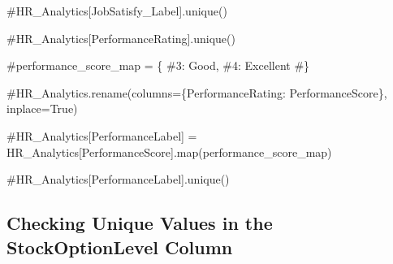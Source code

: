 \documentclass[
  letterpaper,
  DIV=11,
  numbers=noendperiod]{scrartcl}
\newenvironment{Shaded}{\begin{snugshade}}{\end{snugshade}}
\newcommand{\CommentTok}[1]{\textcolor[rgb]{0.37,0.37,0.37}{#1}}
\begin{document}
\begin{Shaded}
\begin{Highlighting}[]
\CommentTok{\#HR\_Analytics[\textquotesingle{}JobSatisfy\_Label\textquotesingle{}].unique()}
\end{Highlighting}
\end{Shaded}

\begin{Shaded}
\begin{Highlighting}[]
\CommentTok{\#HR\_Analytics[\textquotesingle{}PerformanceRating\textquotesingle{}].unique()}
\end{Highlighting}
\end{Shaded}

\begin{Shaded}
\begin{Highlighting}[]
\CommentTok{\#performance\_score\_map = \{}
    \CommentTok{\#3: \textquotesingle{}Good\textquotesingle{},}
    \CommentTok{\#4: \textquotesingle{}Excellent\textquotesingle{}}
\CommentTok{\#\}}
\end{Highlighting}
\end{Shaded}

\begin{Shaded}
\begin{Highlighting}[]
\CommentTok{\#HR\_Analytics.rename(columns=\{\textquotesingle{}PerformanceRating\textquotesingle{}: \textquotesingle{}PerformanceScore\textquotesingle{}\}, inplace=True)}
\end{Highlighting}
\end{Shaded}

\begin{Shaded}
\begin{Highlighting}[]
\CommentTok{\#HR\_Analytics[\textquotesingle{}PerformanceLabel\textquotesingle{}] = HR\_Analytics[\textquotesingle{}PerformanceScore\textquotesingle{}].map(performance\_score\_map)}
\end{Highlighting}
\end{Shaded}

\begin{Shaded}
\begin{Highlighting}[]
\CommentTok{\#HR\_Analytics[\textquotesingle{}PerformanceLabel\textquotesingle{}].unique()}
\end{Highlighting}
\end{Shaded}

\subsection{Checking Unique Values in the StockOptionLevel
Column}\label{checking-unique-values-in-the-stockoptionlevel-column}
\end{document}
